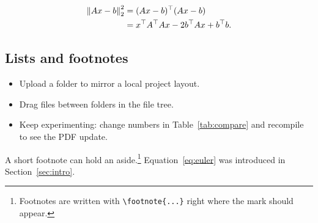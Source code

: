 \begin{align}
  \left\lVert Ax - b \right\rVert_2^2
    &= (Ax - b)^\top (Ax - b) \\
    &= x^\top A^\top A x - 2 b^\top A x + b^\top b.
\end{align}

\subsection{Lists and footnotes}
\begin{itemize}
  \item Upload a folder to mirror a local project layout.
  \item Drag files between folders in the file tree.
  \item Keep experimenting: change numbers in Table~\ref{tab:compare} and
        recompile to see the PDF update.
\end{itemize}

A short footnote can hold an aside.\footnote{Footnotes are written with
\texttt{\textbackslash footnote\{...\}} right where the mark should appear.}
Equation~\eqref{eq:euler} was introduced in Section~\ref{sec:intro}.

